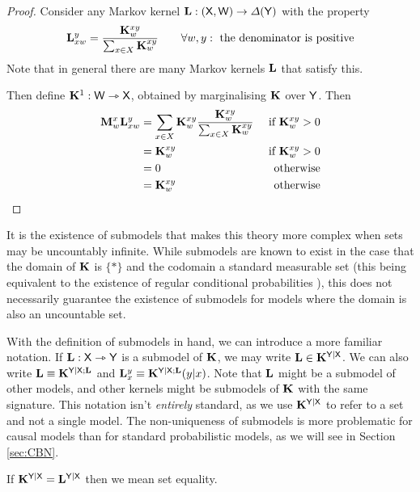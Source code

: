 \begin{proof}
Consider any Markov kernel $\mathbf{L}:(\mathsf{X},\mathsf{W})\to \Delta(\mathsf{Y})$ with the property
\begin{align}
	\mathbf{L}_{xw}^{y} = \frac{\mathbf{K}_w^{xy}}{\sum_{x\in X}\mathbf{K}_w^{xy}}\qquad\forall {w,y}:\text{ the denominator is positive}
\end{align}
Note that in general there are many Markov kernels $\mathbf{L}$ that satisfy this.

Then define $\mathbf{K}^1:\mathsf{W}\rightarrowtriangle \mathsf{X}$, obtained by marginalising $\mathbf{K}$ over $\mathsf{Y}$. Then
\begin{align}
	\mathbf{M}_w^x\mathbf{L}_{xw}^y &= \sum_{x\in X} \mathbf{K}_w^{xy} \frac{\mathbf{K}_w^{xy}}{\sum_{x\in X}\mathbf{K}_w^{xy}} &\text{ if }\mathbf{K}_w^{xy}>0\\
												   &= \mathbf{K}_w^{xy} &\text{ if }\mathbf{K}_w^{xy}>0\\
												   &= 0 &\text{otherwise}\\
												   &= \mathbf{K}_w^{xy} &\text{otherwise}
\end{align}
\end{proof}

It is the existence of submodels that makes this theory more complex when sets may be uncountably infinite. While submodels are known to exist in the case that the domain of $\mathbf{K}$ is $\{*\}$ and the codomain a standard measurable set (this being equivalent to the existence of regular conditional probabilities \citet{cho_disintegration_2019}), this does not necessarily guarantee the existence of submodels for models where the domain is also an uncountable set.

With the definition of submodels in hand, we can introduce a more familiar notation. If $\mathbf{L}:\mathsf{X}\rightarrowtriangle \mathsf{Y}$ is a submodel of $\mathbf{K}$, we may write $\mathbf{L}\in \mathbf{K}^{\mathsf{Y}|\mathsf{X}}$. We can also write $\mathbf{L}\equiv \mathbf{K}^{\mathsf{Y}|\mathsf{X};\mathbf{L}}$ and $\mathbf{L}_x^y\equiv \mathbf{K}^{\mathsf{Y}|\mathsf{X};\mathbf{L}}(y|x)$. Note that $\mathbf{L}$ might be a submodel of other models, and other kernels might be submodels of $\mathbf{K}$ with the same signature. This notation isn't \emph{entirely} standard, as we use $\mathbf{K}^{\mathsf{Y}|\mathsf{X}}$ to refer to a set and not a single model. The non-uniqueness of submodels is more problematic for causal models than for standard probabilistic models, as we will see in Section \ref{sec:CBN}.

If $\mathbf{K}^{\mathsf{Y}|\mathsf{X}}=\mathbf{L}^{\mathsf{Y}|\mathsf{X}}$ then we mean set equality.

